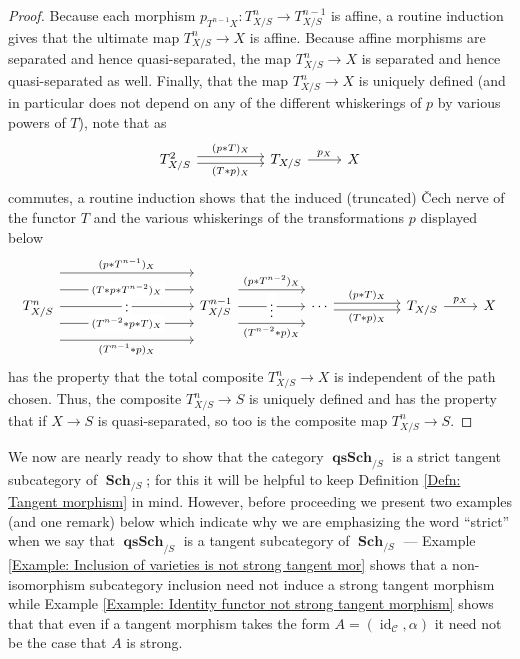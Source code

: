 \documentclass{amsart}
\theoremstyle{definition}
\DeclareMathOperator{\Cscr}{\mathscr{C}}
\DeclareMathOperator{\qsSch}{\mathbf{qsSch}}
\DeclareMathOperator{\id}{id}
\DeclareMathOperator{\Sch}{\mathbf{Sch}}
\numberwithin{equation}{subsection}
\begin{document}
\begin{proof}
Because each morphism $p_{T^{n-1}X}:T^n_{X/S} \to T^{n-1}_{X/S}$  is affine, a routine induction gives that the ultimate map $T^n_{X/S} \to X$ is affine. Because affine morphisms are separated and hence quasi-separated, the map $T^n_{X/S} \to X$ is separated and hence quasi-separated as well. Finally, that the map $T^n_{X/S} \to X$ is uniquely defined (and in particular does not depend on any of the different whiskerings of $p$ by various powers of $T$), note that as
\[
\begin{tikzcd}
T_{X/S}^2 \ar[rr, shift left = 1]{}{(p \ast T)_X} \ar[rr, shift right = 1, swap]{}{(T \ast p)_X} & & T_{X/S} \ar[r]{}{p_X} & X
\end{tikzcd}
\] 
commutes, a routine induction shows that the induced (truncated) \v{C}ech nerve of the functor $T$ and the various whiskerings of the transformations $p$ displayed below
\[
\begin{tikzcd}
T^n_{X/S} \ar[rrrr, shift left = 10]{}{(p \ast T^{n-1})_X} \ar[rrrr, shift left = 5]{}[description]{(T \ast p \ast T^{n-2})_X} \ar[rrrr]{}[description]{\vdots} \ar[rrrr, shift right = 5]{}[description]{(T^{n-2} \ast p \ast T)_X} \ar[rrrr, shift right = 10, swap]{}{(T^{n-1} \ast p)_X} & & & & T^{n-1}_{X/S} \ar[rr, shift left = 5]{}{(p \ast T^{n-2})_X} \ar[rr, shift right = 5, swap]{}{(T^{n-2} \ast p)_X} \ar[rr]{}[description]{\vdots} & & \cdots \ar[rr, shift left = 1]{}{(p \ast T)_X} \ar[rr, shift right = 1, swap]{}{(T \ast p)_X}  & & T_{X/S} \ar[r]{}{p_X} & X
\end{tikzcd}
\]
has the property that the total composite $T^n_{X/S} \to X$ is independent of the path chosen. Thus, the composite $T_{X/S}^n \to S$ is uniquely defined and has the property that if $X \to S$ is quasi-separated, so too is the composite map $T^n_{X/S} \to S$.
\end{proof}

We now are nearly ready to show that the category $\qsSch_{/S}$ is a strict tangent subcategory of $\Sch_{/S}$; for this it will be helpful to keep Definition \ref{Defn: Tangent morphism} in mind. However, before proceeding we present two examples (and one remark) below which indicate why we are emphasizing the word ``strict'' when we say that $\qsSch_{/S}$ is a tangent subcategory of $\Sch_{/S}$ --- Example \ref{Example: Inclusion of varieties is not strong tangent mor} shows that a non-isomorphism subcategory inclusion need not induce a strong tangent morphism while Example \ref{Example: Identity functor not strong tangent morphism} shows that that even if a tangent morphism takes the form $A = (\id_{\Cscr},\alpha)$ it need not be the case that $A$ is strong.
\end{document}
